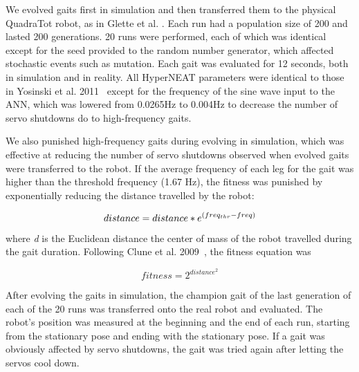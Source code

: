 We evolved gaits first in simulation and then transferred them to the physical QuadraTot robot, as in Glette et al. \cite{glette}. 
Each run had a population size of 200 and lasted 200 generations. 20 runs were performed, each of which was identical except for the seed provided to the random number generator, which affected stochastic events such as mutation. 
Each gait was evaluated for 12 seconds, both in simulation and in reality. 
All HyperNEAT parameters were identical to those in Yosinski et al. 2011~\cite{yos:clune} except for the frequency of the sine wave input to the ANN, which was lowered from 0.0265Hz to 0.004Hz to decrease the number of servo shutdowns do to high-frequency gaits. 


%
%

We also punished high-frequency gaits during evolving in simulation, which was effective at reducing the number of servo shutdowns observed when evolved gaits were transferred to the robot. 
If the average frequency of each leg for the gait was higher than the threshold frequency (1.67 Hz), the fitness was punished by exponentially reducing the distance travelled by the robot:

\begin{equation}
distance = distance*e^{(freq_{thr}-freq)} \\
\end{equation}

\noindent where \emph{d} is the Euclidean distance the center of mass of the robot travelled during the gait duration. Following Clune et al. 2009~\cite{clune2009evolving}, the fitness equation was 

\begin{equation}
fitness = 2^{distance^{2}}
\end{equation}

After evolving the gaits in simulation, the champion gait of the last generation of each of the 20 runs was transferred onto the real robot and evaluated.
The robot's position was measured at the beginning and the end of each run, starting from the stationary pose and ending with the stationary pose. 
If a gait was obviously affected by servo shutdowns, the gait was tried again after letting the servos cool down. 

